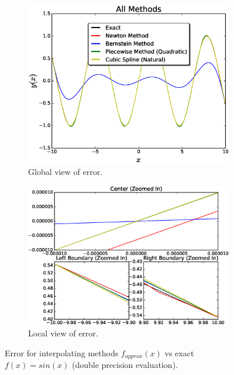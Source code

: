 \documentclass[12pt]{article}
\theoremstyle{remark}
\begin{document}
\begin{figure}[H]
	\centering
	\begin{subfigure}{.5\textwidth}
		\centering
		\includegraphics[width=1.1\linewidth]{Nfig4.eps}
		\caption{Global view of error.}
		\label{fig:sub1}
	\end{subfigure}%
	\begin{subfigure}{.5\textwidth}
		\centering
		\includegraphics[width=1.1\linewidth]{NsubFig4.eps}
		\caption{Local view of error.}
		\label{fig:sub2}
	\end{subfigure}
	\caption{Error for interpolating methods $f_{approx}(x)$ vs exact $f(x) = sin(x)$ (double precision evaluation). }
	\label{fig:test}
\end{figure}
\end{document}
